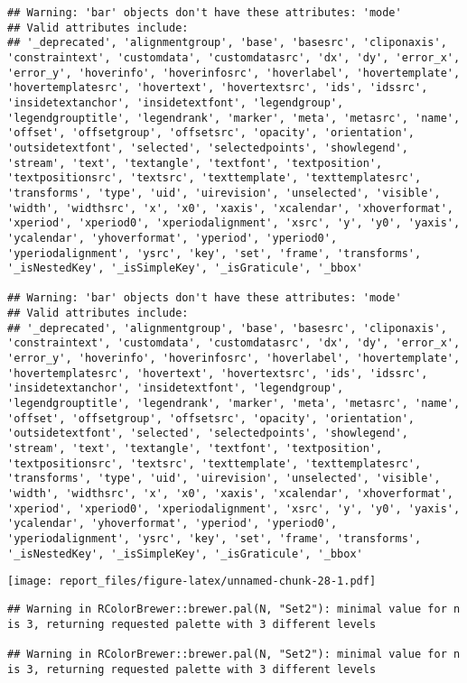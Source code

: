 \documentclass[
]{article}
\begin{document}
\begin{verbatim}
## Warning: 'bar' objects don't have these attributes: 'mode'
## Valid attributes include:
## '_deprecated', 'alignmentgroup', 'base', 'basesrc', 'cliponaxis', 'constraintext', 'customdata', 'customdatasrc', 'dx', 'dy', 'error_x', 'error_y', 'hoverinfo', 'hoverinfosrc', 'hoverlabel', 'hovertemplate', 'hovertemplatesrc', 'hovertext', 'hovertextsrc', 'ids', 'idssrc', 'insidetextanchor', 'insidetextfont', 'legendgroup', 'legendgrouptitle', 'legendrank', 'marker', 'meta', 'metasrc', 'name', 'offset', 'offsetgroup', 'offsetsrc', 'opacity', 'orientation', 'outsidetextfont', 'selected', 'selectedpoints', 'showlegend', 'stream', 'text', 'textangle', 'textfont', 'textposition', 'textpositionsrc', 'textsrc', 'texttemplate', 'texttemplatesrc', 'transforms', 'type', 'uid', 'uirevision', 'unselected', 'visible', 'width', 'widthsrc', 'x', 'x0', 'xaxis', 'xcalendar', 'xhoverformat', 'xperiod', 'xperiod0', 'xperiodalignment', 'xsrc', 'y', 'y0', 'yaxis', 'ycalendar', 'yhoverformat', 'yperiod', 'yperiod0', 'yperiodalignment', 'ysrc', 'key', 'set', 'frame', 'transforms', '_isNestedKey', '_isSimpleKey', '_isGraticule', '_bbox'

## Warning: 'bar' objects don't have these attributes: 'mode'
## Valid attributes include:
## '_deprecated', 'alignmentgroup', 'base', 'basesrc', 'cliponaxis', 'constraintext', 'customdata', 'customdatasrc', 'dx', 'dy', 'error_x', 'error_y', 'hoverinfo', 'hoverinfosrc', 'hoverlabel', 'hovertemplate', 'hovertemplatesrc', 'hovertext', 'hovertextsrc', 'ids', 'idssrc', 'insidetextanchor', 'insidetextfont', 'legendgroup', 'legendgrouptitle', 'legendrank', 'marker', 'meta', 'metasrc', 'name', 'offset', 'offsetgroup', 'offsetsrc', 'opacity', 'orientation', 'outsidetextfont', 'selected', 'selectedpoints', 'showlegend', 'stream', 'text', 'textangle', 'textfont', 'textposition', 'textpositionsrc', 'textsrc', 'texttemplate', 'texttemplatesrc', 'transforms', 'type', 'uid', 'uirevision', 'unselected', 'visible', 'width', 'widthsrc', 'x', 'x0', 'xaxis', 'xcalendar', 'xhoverformat', 'xperiod', 'xperiod0', 'xperiodalignment', 'xsrc', 'y', 'y0', 'yaxis', 'ycalendar', 'yhoverformat', 'yperiod', 'yperiod0', 'yperiodalignment', 'ysrc', 'key', 'set', 'frame', 'transforms', '_isNestedKey', '_isSimpleKey', '_isGraticule', '_bbox'
\end{verbatim}

\texttt{[image: report\_files/figure-latex/unnamed-chunk-28-1.pdf]}

\begin{verbatim}
## Warning in RColorBrewer::brewer.pal(N, "Set2"): minimal value for n is 3, returning requested palette with 3 different levels

## Warning in RColorBrewer::brewer.pal(N, "Set2"): minimal value for n is 3, returning requested palette with 3 different levels
\end{verbatim}
\end{document}
